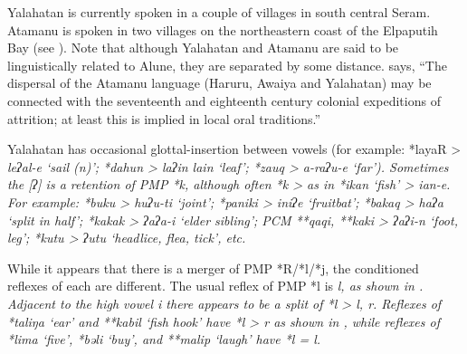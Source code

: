 Yalahatan is currently spoken in a couple of villages in south central Seram.
Atamanu is spoken in two villages on the northeastern coast of
the Elpaputih Bay (see ).
Note that although Yalahatan
and Atamanu are said to be linguistically related to Alune,
they are separated by some distance.
\citet[38]{Collins1983} says, “The dispersal of the Atamanu language
(Haruru, Awaiya and Yalahatan) may be connected with the seventeenth
and eighteenth century colonial expeditions of attrition; at
least this is implied in local oral traditions.”

Yalahatan has occasional glottal-insertion between vowels (for
example: \mbox{*layaR} > \it{leʔal-e} ‘sail (n)’; *dahun > \it{laʔin
{\tl} lain} ‘leaf’; *zauq > \it{a-raʔu-e} ‘far’).
Sometimes the [ʔ] is a retention of PMP *k,
although often *k > {\0} as in *ikan ‘fish’ > \it{ian-e}.
For example: *buku > \it{huʔu-ti} ‘joint’; *paniki > \it{iniʔe}
‘fruitbat’; *bakaq > \it{haʔa} ‘split in half’; *kakak > \it{ʔaʔa-i}
‘elder sibling’; PCM **qaqi,
**kaki > \it{ʔaʔi-n} ‘foot,
leg’; *kutu > \it{ʔutu} ‘headlice, flea, tick’, etc.

While it appears that there is a merger of PMP *R/*l/*j,
the conditioned reflexes of each are different.
The usual reflex of PMP *l is \it{l,} as shown in .
Adjacent to the high vowel \it{i} there appears to be a split
of *l > \it{l, r}.
Reflexes of *taliŋa ‘ear’
and **kabil ‘fish hook’ have *l > \it{r} as shown in ,
while reflexes of *lima ‘five’,
*bəli ‘buy’, and **malip ‘laugh’ have *l = \it{l}.
\\

